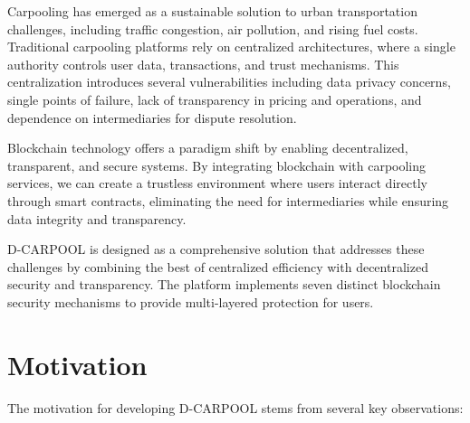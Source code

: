 \documentclass[12pt]{report}
\theoremstyle{plain}
\theoremstyle{definition}
\theoremstyle{remark}
\begin{document}
Carpooling has emerged as a sustainable solution to urban transportation challenges, including traffic congestion, air pollution, and rising fuel costs. Traditional carpooling platforms rely on centralized architectures, where a single authority controls user data, transactions, and trust mechanisms. This centralization introduces several vulnerabilities including data privacy concerns, single points of failure, lack of transparency in pricing and operations, and dependence on intermediaries for dispute resolution.

Blockchain technology offers a paradigm shift by enabling decentralized, transparent, and secure systems. By integrating blockchain with carpooling services, we can create a trustless environment where users interact directly through smart contracts, eliminating the need for intermediaries while ensuring data integrity and transparency.

D-CARPOOL is designed as a comprehensive solution that addresses these challenges by combining the best of centralized efficiency with decentralized security and transparency. The platform implements seven distinct blockchain security mechanisms to provide multi-layered protection for users.

\section{Motivation}

The motivation for developing D-CARPOOL stems from several key observations:
\end{document}
